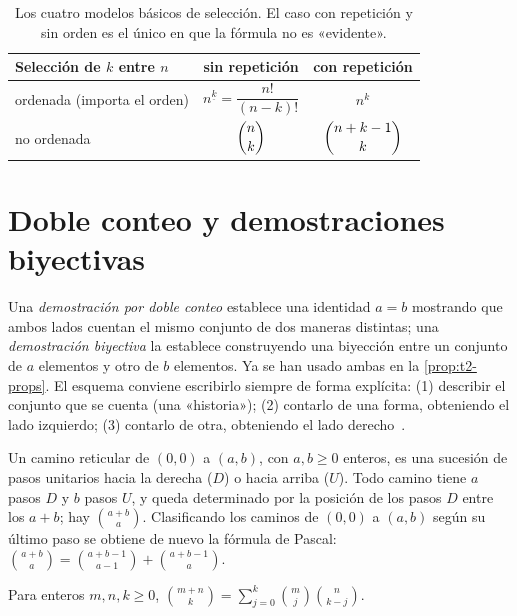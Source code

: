 \begin{table}[h]
\centering
\begin{tabular}{@{}lcc@{}}
\toprule
Selección de $k$ entre $n$ & sin repetición & con repetición \\
\midrule
ordenada (importa el orden) & $n^{\underline{k}}=\dfrac{n!}{(n-k)!}$ & $n^{k}$ \\[8pt]
no ordenada & $\dbinom{n}{k}$ & $\dbinom{n+k-1}{k}$ \\
\bottomrule
\end{tabular}
\caption{Los cuatro modelos básicos de selección. El caso con repetición y sin orden es el único en que la fórmula no es «evidente».}
\label{tab:t2-modelos}
\end{table}

\section{Doble conteo y demostraciones biyectivas}

Una \emph{demostración por doble conteo} establece una identidad $a=b$ mostrando que ambos lados cuentan el mismo conjunto de dos maneras distintas; una \emph{demostración biyectiva} la establece construyendo una biyección entre un conjunto de $a$ elementos y otro de $b$ elementos. Ya se han usado ambas en la \cref{prop:t2-props}. El esquema conviene escribirlo siempre de forma explícita: (1) describir el conjunto que se cuenta (una «historia»); (2) contarlo de una forma, obteniendo el lado izquierdo; (3) contarlo de otra, obteniendo el lado derecho~\cite[§1.5]{bh}.

\begin{ejemplo}\label{ej:t2-caminos}
Un camino reticular de $(0,0)$ a $(a,b)$, con $a,b\ge 0$ enteros, es una sucesión de pasos unitarios hacia la derecha ($D$) o hacia arriba ($U$). Todo camino tiene $a$ pasos $D$ y $b$ pasos $U$, y queda determinado por la posición de los pasos $D$ entre los $a+b$; hay $\binom{a+b}{a}$. Clasificando los caminos de $(0,0)$ a $(a,b)$ según su último paso se obtiene de nuevo la fórmula de Pascal: $\binom{a+b}{a}=\binom{a+b-1}{a-1}+\binom{a+b-1}{a}$.
\end{ejemplo}

\begin{proposicion}\label{prop:t2-vandermonde}
Para enteros $m,n,k\ge0$, $\displaystyle\binom{m+n}{k}=\sum_{j=0}^{k}\binom{m}{j}\binom{n}{k-j}$.
\end{proposicion}

